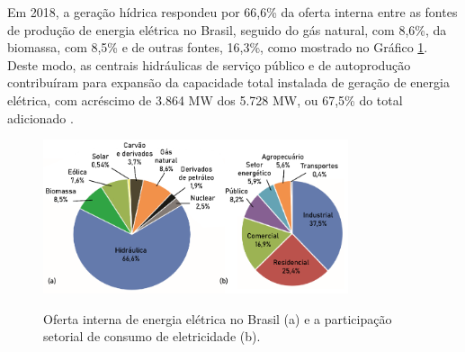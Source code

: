 \begin{onehalfspace}
    Em 2018, a geração hídrica respondeu por 66,6\% da oferta interna entre as fontes de 
    produção de energia elétrica no Brasil, seguido do gás natural, com 8,6\%, da biomassa, 
    com 8,5\% e de outras fontes, 16,3\%, como mostrado no Gráfico \ref{Grafico 1}. Deste modo, 
    as centrais hidráulicas de serviço público e de autoprodução contribuíram para expansão 
    da capacidade total instalada de geração de energia elétrica, com acréscimo de 3.864 MW 
    dos 5.728 MW, ou 67,5\% do total adicionado \cite{EmpresadePesquisaEnergetica-EPE2019}.
    \begin{figure}[h]
        \centering
        \caption{\small Oferta interna de energia elétrica no Brasil (a) e a participação setorial de consumo de eletricidade (b).}
        \includegraphics[width=0.8\textwidth]{graphs/graph1.png}
        \label{Grafico 1}
    \end{figure}
\end{onehalfspace}